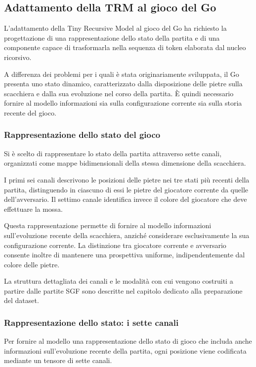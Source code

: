 \subsection{Adattamento della TRM al gioco del Go}

L'adattamento della Tiny Recursive Model al gioco del Go ha richiesto la progettazione di una rappresentazione dello stato della partita e di una componente capace di trasformarla nella sequenza di token elaborata dal nucleo ricorsivo.

A differenza dei problemi per i quali è stata originariamente sviluppata, il Go presenta uno stato dinamico, caratterizzato dalla disposizione delle pietre sulla scacchiera e dalla sua evoluzione nel corso della partita. È quindi necessario fornire al modello informazioni sia sulla configurazione corrente sia sulla storia recente del gioco.

\subsubsection{Rappresentazione dello stato del gioco}

Si è scelto di rappresentare lo stato della partita attraverso sette canali, organizzati come mappe bidimensionali della stessa dimensione della scacchiera.

I primi sei canali descrivono le posizioni delle pietre nei tre stati più recenti della partita, distinguendo in ciascuno di essi le pietre del giocatore corrente da quelle dell'avversario. Il settimo canale identifica invece il colore del giocatore che deve effettuare la mossa.

Questa rappresentazione permette di fornire al modello informazioni sull'evoluzione recente della scacchiera, anziché considerare esclusivamente la sua configurazione corrente.
La distinzione tra giocatore corrente e avversario consente inoltre di mantenere una prospettiva uniforme, indipendentemente dal colore delle pietre.

La struttura dettagliata dei canali e le modalità con cui vengono costruiti a partire dalle partite SGF sono descritte nel capitolo dedicato alla preparazione del dataset.

\subsubsection{Rappresentazione dello stato: i sette canali}

Per fornire al modello una rappresentazione dello stato di gioco che
includa anche informazioni sull'evoluzione recente della partita, ogni
posizione viene codificata mediante un tensore di sette canali.

